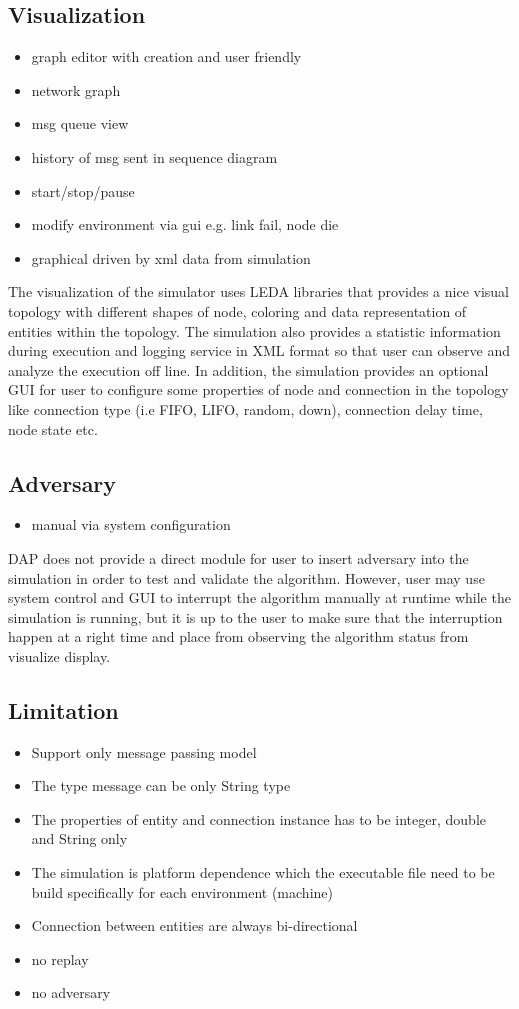 \subsection*{Visualization}
\begin{itemize}
\item graph editor with creation and user friendly
\item network graph
\item msg queue view
\item history of msg sent in sequence diagram
\item start/stop/pause
\item modify environment via gui e.g. link fail, node die
\item graphical driven by xml data from simulation
\end{itemize}


The visualization of the simulator uses LEDA libraries that provides a nice visual topology with different shapes of node, coloring and data representation of entities within the topology. The simulation also provides a statistic information during execution and logging service in XML format so that user can observe and analyze the execution off line. In addition, the simulation provides an optional GUI for user to configure some properties of node and connection in the topology like connection type (i.e FIFO, LIFO, random, down), connection delay time, node state etc.

\subsection*{Adversary}
\begin{itemize}
\item manual via system configuration
\end{itemize}

DAP does not provide a direct module for user to insert adversary into the simulation in order to test and validate the algorithm. However, user may use system control and GUI to interrupt the algorithm manually at runtime while the simulation is running, but it is up to the user to make sure that the interruption happen at a right time and place from observing the algorithm status from visualize display.


\subsection*{Limitation}
\begin{itemize}
\item Support only message passing model
\item The type message can be only String type
\item The properties of entity and connection instance has to be integer, double and String only
\item The simulation is platform dependence which the executable file need to be build specifically for each environment (machine)
\item Connection between entities are always bi-directional
\item no replay
\item no adversary
\end{itemize}


